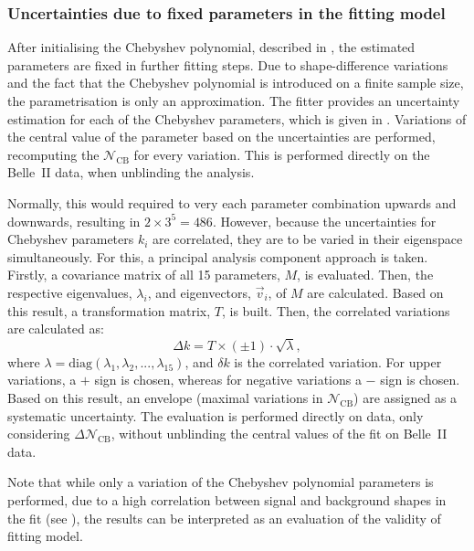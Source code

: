 \subsubsection{Uncertainties due to fixed parameters in the \texorpdfstring{\Mbc}{Mbc} fitting model}\label{sec:fitting_model_uncertainties}

After initialising the Chebyshev polynomial, described in , the estimated parameters are fixed in further fitting steps.
Due to shape-difference variations and the fact that the Chebyshev polynomial is introduced on a finite sample size, the parametrisation is only an approximation.
The \Mbc fitter provides an uncertainty estimation for each of the Chebyshev \PDF parameters, which is given in .
Variations of the central value of the parameter based on the uncertainties are performed, recomputing the $\mathcal{N}_{\mathrm{CB}}$ for every variation.
This is performed directly on the Belle~II data, when unblinding the analysis.

Normally, this would required to very each parameter combination upwards and downwards, resulting in $2\times3^5=486$.
However, because the uncertainties for Chebyshev parameters $k_i$ are correlated, they are to be varied in their eigenspace simultaneously.
For this, a principal analysis component approach is taken.
Firstly, a covariance matrix of all 15 parameters, $M$, is evaluated.
Then, the respective eigenvalues, $\lambda_i$, and eigenvectors, $\vec{v}_i$, of $M$ are calculated.
Based on this result, a transformation matrix, $T$, is built.
Then, the correlated variations are calculated as:
\begin{equation}
    \Delta k = T \times (\pm1)\cdot \sqrt{\lambda},
\end{equation}
where $\lambda=\mathrm{diag}(\lambda_1, \lambda_2,...,\lambda_{15})$, and $\delta k$ is the correlated variation.
For upper variations, a $+$ sign is chosen, whereas for negative variations a $-$ sign is chosen.
Based on this result, an envelope (maximal variations in $\mathcal{N}_{\mathrm{CB}}$) are assigned as a systematic uncertainty.
The evaluation is performed directly on data, only considering $\Delta\mathcal{N}_{\mathrm{CB}}$, without unblinding the central values of the \Mbc fit on Belle~II data.

Note that while only a variation of the Chebyshev polynomial parameters is performed, 
due to a high correlation between signal and background \PDF shapes in the fit (see ),
the results can be interpreted as an evaluation of the validity of fitting model.

